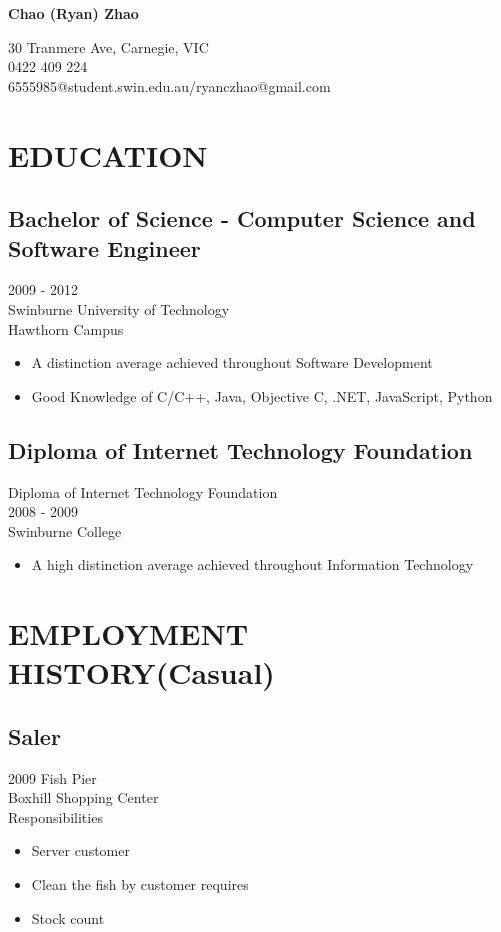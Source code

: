 \documentclass{article}
\begin{document}
 
\begin{center}
\bfseries\Huge{Chao (Ryan) Zhao }
\end{center}
\begin{center}
30 Tranmere Ave, Carnegie, VIC\\
0422 409 224 \\
6555985@student.swin.edu.au/ryanczhao@gmail.com \\
\end{center}

\section*{EDUCATION}
\subsection*{Bachelor of Science - Computer Science and Software Engineer}
2009 - 2012 \\
Swinburne University of Technology \\
Hawthorn Campus \\
\begin{itemize}
	\item A distinction average achieved throughout Software Development
	\item Good Knowledge of C/C++, Java, Objective C, .NET, JavaScript, Python
\end{itemize}

\subsection*{Diploma of Internet Technology Foundation}
Diploma of Internet Technology Foundation \\
2008 - 2009 \\
Swinburne College \\
\begin{itemize}
	\item  A high distinction average achieved throughout Information Technology
\end{itemize}

\section*{EMPLOYMENT HISTORY(Casual)}

\subsection*{Saler}
2009 Fish Pier\\
Boxhill Shopping Center\\
Responsibilities\\
	\begin{itemize}
		\item Server customer
	\item Clean the fish by customer requires
	\item Stock count
	\end{itemize}
\end{document}
